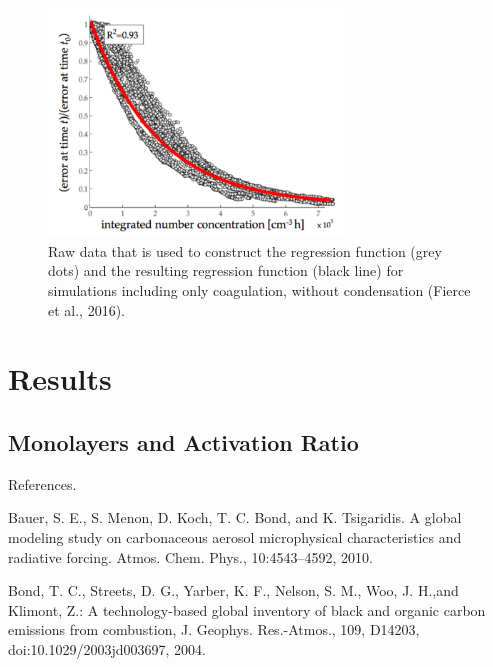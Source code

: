 \documentclass[12pt]{article}
\begin{document}
		\begin{figure}[!h] 
			\begin{center}
				\includegraphics[width = 0.7\textwidth]{Figure02}
				\caption[]{\label{fig_P2}Raw data that is used to construct the regression function (grey dots) and the resulting regression function (black line) for simulations including only coagulation, without condensation (Fierce et al., 2016).}
			\end{center}
		\end{figure}
 
 	\clearpage
 	
	\section{Results}
	
	\subsection{Monolayers and Activation Ratio}

	
	
	
	
	
	
%	
%	
	
	
	
	
	
	
	
References.

Bauer, S. E.,  S. Menon, D. Koch, T. C. Bond, and K. Tsigaridis. A global modeling study on carbonaceous aerosol microphysical characteristics and radiative forcing. Atmos. Chem. Phys., 10:4543–4592, 2010.

Bond, T. C., Streets, D. G., Yarber, K. F., Nelson, S. M., Woo, J. H.,and Klimont, Z.: A technology-based global inventory of black and organic carbon emissions from combustion, J. Geophys. Res.-Atmos., 109, D14203, doi:10.1029/2003jd003697, 2004.
\end{document}
